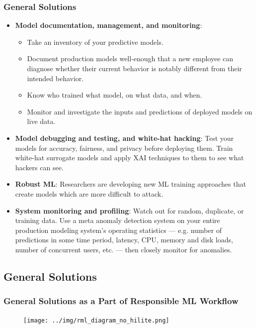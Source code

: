 \documentclass[11pt,
               aspectratio=169,
               hyperref={colorlinks}
               ]{beamer}
\begin{document}
			\begin{frame}
				\frametitle{General Solutions}
				\scriptsize
				\begin{itemize}
					\item \textbf{Model documentation, management, and monitoring}:
						\begin{itemize}\scriptsize
							\item Take an inventory of your predictive models. 
							\item Document production models well-enough that a new employee can diagnose whether their current behavior is notably different from their intended behavior. 
							\item Know who trained what model, on what data, and when.
							\item Monitor and investigate the inputs and predictions of deployed models on live data.	
						\end{itemize}
					\item \textbf{Model debugging and testing, and white-hat hacking}: Test your models for accuracy, fairness, and privacy before deploying them. Train white-hat surrogate models and apply XAI techniques to them to see what hackers can see. 
					\item \textbf{Robust ML}: Researchers are developing new ML training approaches that create models which are more difficult to attack. 
					\item \textbf{System monitoring and profiling}: Watch out for random, duplicate, or training data. Use a meta anomaly detection system on your entire production modeling system’s operating statistics — e.g. number of predictions in some time period, latency, CPU, memory and disk loads, number of concurrent users, etc. — then closely monitor for anomalies.
				\end{itemize}
				\normalsize
			\end{frame}

		\subsection{General Solutions}

		\begin{frame}
		
			\frametitle{General Solutions as a Part of Responsible ML Workflow}		
			
			\begin{figure}[htb]
				\begin{center}
					\texttt{[image: ../img/rml\_diagram\_no\_hilite.png]}
				\end{center}
			\end{figure}	

		\end{frame}
\end{document}
